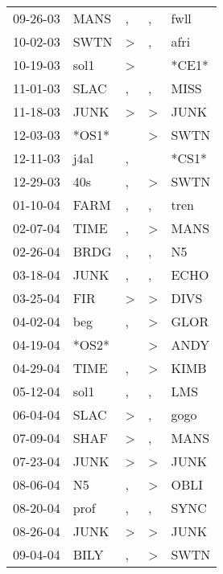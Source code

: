 \begin{supertabular}{lllll}
 09-26-03 &   MANS &                , &                , &   fwll \\
 10-02-03 &   SWTN &     \textgreater &                , &   afri \\
 10-19-03 &   sol1 &     \textgreater &                  &  *CE1* \\
 11-01-03 &   SLAC &                , &                , &   MISS \\
 11-18-03 &   JUNK &     \textgreater &     \textgreater &   JUNK \\
 12-03-03 &  *OS1* &                  &     \textgreater &   SWTN \\
 12-11-03 &   j4al &                , &                  &  *CS1* \\
 12-29-03 &    40s &                , &     \textgreater &   SWTN \\
 01-10-04 &   FARM &                , &                , &   tren \\
 02-07-04 &   TIME &                , &     \textgreater &   MANS \\
 02-26-04 &   BRDG &                , &                , &     N5 \\
 03-18-04 &   JUNK &                , &                , &   ECHO \\
 03-25-04 &    FIR &     \textgreater &     \textgreater &   DIVS \\
 04-02-04 &    beg &                , &     \textgreater &   GLOR \\
 04-19-04 &  *OS2* &                  &     \textgreater &   ANDY \\
 04-29-04 &   TIME &                , &     \textgreater &   KIMB \\
 05-12-04 &   sol1 &                , &                , &    LMS \\
 06-04-04 &   SLAC &     \textgreater &                , &   gogo \\
 07-09-04 &   SHAF &     \textgreater &                , &   MANS \\
 07-23-04 &   JUNK &     \textgreater &     \textgreater &   JUNK \\
 08-06-04 &     N5 &                , &     \textgreater &   OBLI \\
 08-20-04 &   prof &                , &                , &   SYNC \\
 08-26-04 &   JUNK &     \textgreater &     \textgreater &   JUNK \\
 09-04-04 &   BILY &                , &     \textgreater &   SWTN \\

\end{supertabular}
